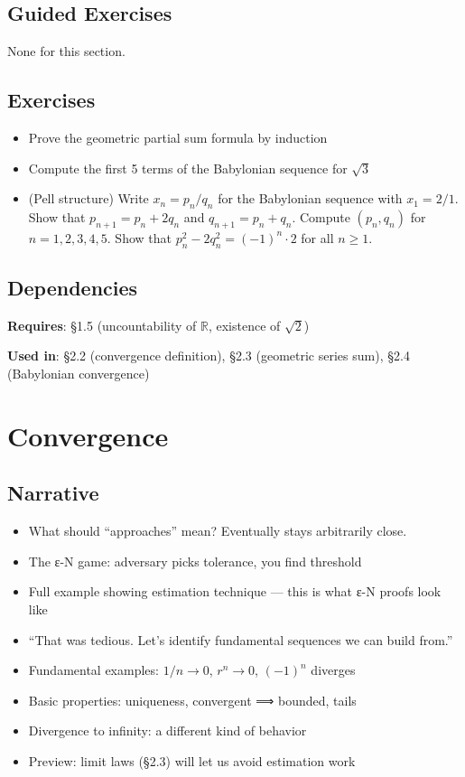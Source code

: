 \documentclass[
  10pt,
  letterpaper,
]{scrbook}
\providecommand{\tightlist}{%
  \setlength{\itemsep}{0pt}\setlength{\parskip}{0pt}}
\newcommand{\RR}{\mathbb{R}}
\begin{document}
\subsection{Guided Exercises}\label{guided-exercises-2}

None for this section.

\subsection{Exercises}\label{exercises-5}

\begin{itemize}
\tightlist
\item
  Prove the geometric partial sum formula by induction
\item
  Compute the first 5 terms of the Babylonian sequence for \(\sqrt{3}\)
\item
  (Pell structure) Write \(x_n = p_n/q_n\) for the Babylonian sequence
  with \(x_1 = 2/1\). Show that \(p_{n+1} = p_n + 2q_n\) and
  \(q_{n+1} = p_n + q_n\). Compute \((p_n, q_n)\) for
  \(n = 1, 2, 3, 4, 5\). Show that \(p_n^2 - 2q_n^2 = (-1)^n \cdot 2\)
  for all \(n \geq 1\).
\end{itemize}

\subsection{Dependencies}\label{dependencies-5}

\textbf{Requires}: §1.5 (uncountability of \(\RR\), existence of
\(\sqrt{2}\))

\textbf{Used in}: §2.2 (convergence definition), §2.3 (geometric series
sum), §2.4 (Babylonian convergence)

\section{Convergence}\label{convergence}

\subsection{Narrative}\label{narrative-6}

\begin{itemize}
\tightlist
\item
  What should ``approaches'' mean? Eventually stays arbitrarily close.
\item
  The ε-N game: adversary picks tolerance, you find threshold
\item
  Full example showing estimation technique --- this is what ε-N proofs
  look like
\item
  ``That was tedious. Let's identify fundamental sequences we can build
  from.''
\item
  Fundamental examples: \(1/n \to 0\), \(r^n \to 0\), \((-1)^n\)
  diverges
\item
  Basic properties: uniqueness, convergent ⟹ bounded, tails
\item
  Divergence to infinity: a different kind of behavior
\item
  Preview: limit laws (§2.3) will let us avoid estimation work
\end{itemize}
\end{document}
